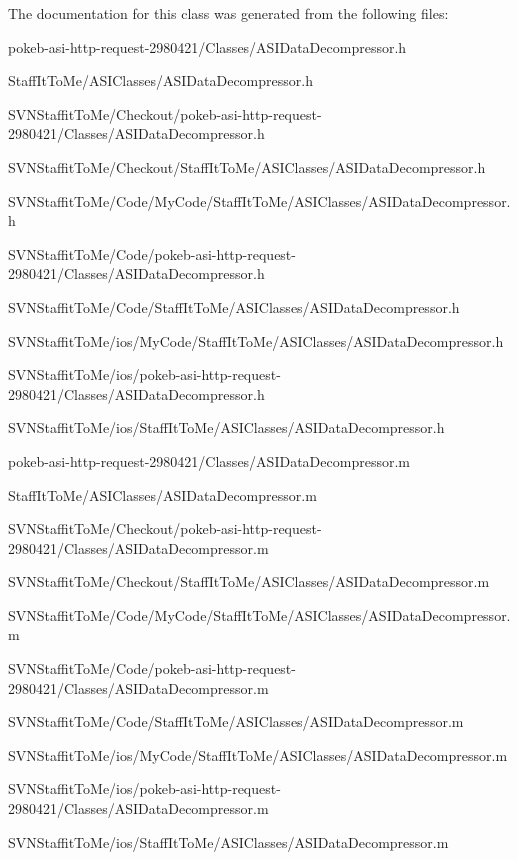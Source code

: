 \-The documentation for this class was generated from the following files\-:\begin{DoxyCompactItemize}
\item 
pokeb-\/asi-\/http-\/request-\/2980421/\-Classes/\-A\-S\-I\-Data\-Decompressor.\-h\item 
\-Staff\-It\-To\-Me/\-A\-S\-I\-Classes/\-A\-S\-I\-Data\-Decompressor.\-h\item 
\-S\-V\-N\-Staffit\-To\-Me/\-Checkout/pokeb-\/asi-\/http-\/request-\/2980421/\-Classes/\-A\-S\-I\-Data\-Decompressor.\-h\item 
\-S\-V\-N\-Staffit\-To\-Me/\-Checkout/\-Staff\-It\-To\-Me/\-A\-S\-I\-Classes/\-A\-S\-I\-Data\-Decompressor.\-h\item 
\-S\-V\-N\-Staffit\-To\-Me/\-Code/\-My\-Code/\-Staff\-It\-To\-Me/\-A\-S\-I\-Classes/\-A\-S\-I\-Data\-Decompressor.\-h\item 
\-S\-V\-N\-Staffit\-To\-Me/\-Code/pokeb-\/asi-\/http-\/request-\/2980421/\-Classes/\-A\-S\-I\-Data\-Decompressor.\-h\item 
\-S\-V\-N\-Staffit\-To\-Me/\-Code/\-Staff\-It\-To\-Me/\-A\-S\-I\-Classes/\-A\-S\-I\-Data\-Decompressor.\-h\item 
\-S\-V\-N\-Staffit\-To\-Me/ios/\-My\-Code/\-Staff\-It\-To\-Me/\-A\-S\-I\-Classes/\-A\-S\-I\-Data\-Decompressor.\-h\item 
\-S\-V\-N\-Staffit\-To\-Me/ios/pokeb-\/asi-\/http-\/request-\/2980421/\-Classes/\-A\-S\-I\-Data\-Decompressor.\-h\item 
\-S\-V\-N\-Staffit\-To\-Me/ios/\-Staff\-It\-To\-Me/\-A\-S\-I\-Classes/\-A\-S\-I\-Data\-Decompressor.\-h\item 
pokeb-\/asi-\/http-\/request-\/2980421/\-Classes/\-A\-S\-I\-Data\-Decompressor.\-m\item 
\-Staff\-It\-To\-Me/\-A\-S\-I\-Classes/\-A\-S\-I\-Data\-Decompressor.\-m\item 
\-S\-V\-N\-Staffit\-To\-Me/\-Checkout/pokeb-\/asi-\/http-\/request-\/2980421/\-Classes/\-A\-S\-I\-Data\-Decompressor.\-m\item 
\-S\-V\-N\-Staffit\-To\-Me/\-Checkout/\-Staff\-It\-To\-Me/\-A\-S\-I\-Classes/\-A\-S\-I\-Data\-Decompressor.\-m\item 
\-S\-V\-N\-Staffit\-To\-Me/\-Code/\-My\-Code/\-Staff\-It\-To\-Me/\-A\-S\-I\-Classes/\-A\-S\-I\-Data\-Decompressor.\-m\item 
\-S\-V\-N\-Staffit\-To\-Me/\-Code/pokeb-\/asi-\/http-\/request-\/2980421/\-Classes/\-A\-S\-I\-Data\-Decompressor.\-m\item 
\-S\-V\-N\-Staffit\-To\-Me/\-Code/\-Staff\-It\-To\-Me/\-A\-S\-I\-Classes/\-A\-S\-I\-Data\-Decompressor.\-m\item 
\-S\-V\-N\-Staffit\-To\-Me/ios/\-My\-Code/\-Staff\-It\-To\-Me/\-A\-S\-I\-Classes/\-A\-S\-I\-Data\-Decompressor.\-m\item 
\-S\-V\-N\-Staffit\-To\-Me/ios/pokeb-\/asi-\/http-\/request-\/2980421/\-Classes/\-A\-S\-I\-Data\-Decompressor.\-m\item 
\-S\-V\-N\-Staffit\-To\-Me/ios/\-Staff\-It\-To\-Me/\-A\-S\-I\-Classes/\-A\-S\-I\-Data\-Decompressor.\-m\end{DoxyCompactItemize}

